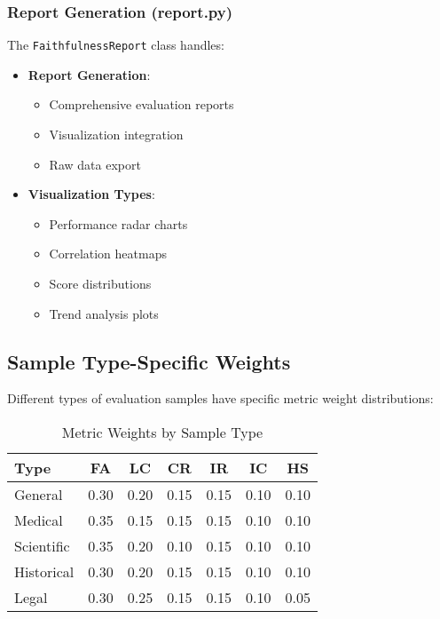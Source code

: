 \subsubsection{Report Generation (report.py)}
The \texttt{FaithfulnessReport} class handles:
\begin{itemize}
    \item \textbf{Report Generation}:
    \begin{itemize}
        \item Comprehensive evaluation reports
        \item Visualization integration
        \item Raw data export
    \end{itemize}
    \item \textbf{Visualization Types}:
    \begin{itemize}
        \item Performance radar charts
        \item Correlation heatmaps
        \item Score distributions
        \item Trend analysis plots
    \end{itemize}
\end{itemize}

\subsection{Sample Type-Specific Weights}
Different types of evaluation samples have specific metric weight distributions:

\begin{table}[h]
\centering
\caption{Metric Weights by Sample Type}
\label{tab:metric_weights}
\begin{tabular}{|l|c|c|c|c|c|c|}
\hline
\textbf{Type} & \textbf{FA} & \textbf{LC} & \textbf{CR} & \textbf{IR} & \textbf{IC} & \textbf{HS} \\
\hline
General & 0.30 & 0.20 & 0.15 & 0.15 & 0.10 & 0.10 \\
Medical & 0.35 & 0.15 & 0.15 & 0.15 & 0.10 & 0.10 \\
Scientific & 0.35 & 0.20 & 0.10 & 0.15 & 0.10 & 0.10 \\
Historical & 0.30 & 0.20 & 0.15 & 0.15 & 0.10 & 0.10 \\
Legal & 0.30 & 0.25 & 0.15 & 0.15 & 0.10 & 0.05 \\
\hline
\end{tabular}
\end{table}

